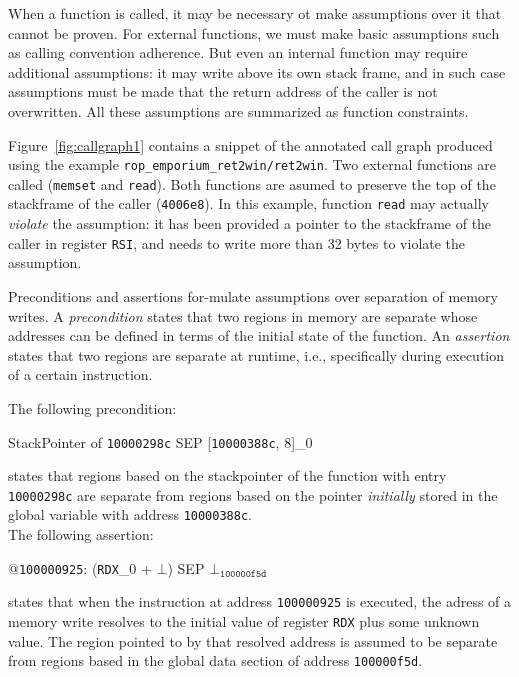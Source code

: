 \documentclass[12pt,a4paper]{article}
\newcounter{example}
\begin{document}
\begin{description}[style=unboxed,leftmargin=0cm,noitemsep,nosep]
\item[FUNCTION CONSTRAINTS.] 
When a function is called, it may be necessary ot make assumptions over it that cannot be proven.
For external functions, we must make basic assumptions such as calling convention adherence.
But even an internal function may require additional assumptions: it may write above its own stack frame, and in such case assumptions must be made that the return address of the caller is not overwritten.
All these assumptions are summarized as function constraints.
\end{description}
\begin{example}
Figure~\ref{fig:callgraph1} contains a snippet of the annotated call graph produced using the example \texttt{rop\_emporium\_ret2win/ret2win}.
Two external functions are called (\texttt{memset} and \texttt{read}).
Both functions are asumed to preserve the top of the stackframe of the caller (\texttt{4006e8}).
In this example, function \texttt{read} may actually \emph{violate} the assumption: it has been provided a pointer to the stackframe of the caller in register \texttt{RSI}, and needs to write more than 32 bytes to violate the assumption.
\end{example}


\begin{description}[style=unboxed,leftmargin=0cm,noitemsep,nosep]
\item[PRECONDITIONS AND ASSERTIONS.] 
Preconditions and assertions for-mulate assumptions over separation of memory writes.
A \emph{precondition} states that two regions in memory are separate whose addresses can be defined in terms of the initial state of the function.
An \emph{assertion} states that two regions are separate at runtime, i.e., specifically during execution of a certain instruction.
\end{description}
\begin{example}
The following precondition:
\begin{center}
StackPointer of \texttt{10000298c} SEP [\texttt{10000388c}, 8]\_0
\end{center}
states that regions based on the stackpointer of the function with entry \texttt{10000298c} are separate from regions based on the pointer \emph{initially} stored in the global variable with address \texttt{10000388c}.
\\
The following assertion:
\begin{center}
@\texttt{100000925}: (\texttt{RDX}\_0 + $\bot$) SEP $\bot_{\mathtt{100000f5d}}$
\end{center}
states that when the instruction at address \texttt{100000925} is executed, the adress of a memory write resolves to the initial value of register \texttt{RDX} plus some unknown value.
The region pointed to by that resolved address is assumed to be separate from regions based in the global data section of address \texttt{100000f5d}.
\end{example}
\end{document}
